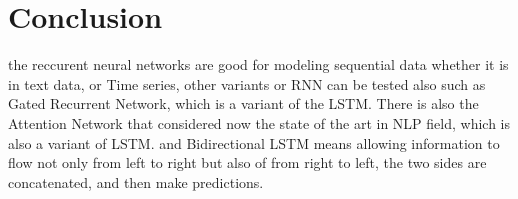 \section{Conclusion}
the reccurent neural networks are good for modeling sequential data whether it is in text data, or Time series, other variants or RNN can be tested also such as  Gated Recurrent Network, which is a variant of the LSTM. There is also the Attention Network that considered now the state of the art in NLP field, which is also a variant of LSTM. and Bidirectional LSTM means allowing information to flow not only from left to right but also of from right to left, the two sides are concatenated, and then make predictions. 




